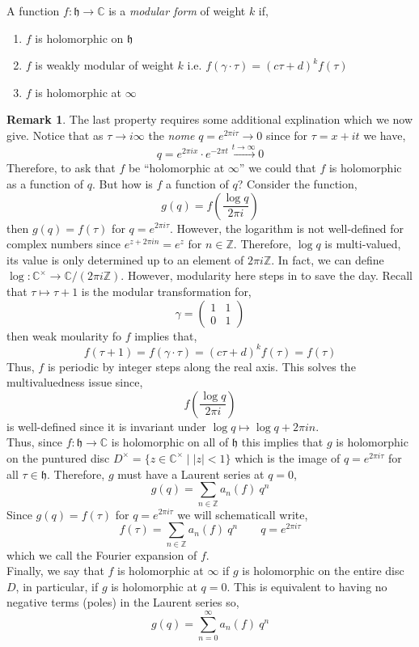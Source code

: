 \documentclass{article}
\newcommand{\Z}{\mathbb{Z}}
\newcommand{\C}{\mathbb{C}}
\theoremstyle{definition}
\newtheorem{remark}{Remark}[section]
\newenvironment{definition}[1][Definition:]{\begin{trivlist}
\item[\hskip \labelsep {\bfseries #1}]}{\end{trivlist}}
\newcommand{\h}{\mathfrak{h}}
\begin{document}
\begin{definition}
A function $f : \h \to \C$ is a \textit{modular form} of weight $k$ if,
\begin{enumerate}
\item $f$ is holomorphic on $\h$
\item $f$ is weakly modular of weight $k$ i.e. $f(\gamma \cdot \tau) = (c \tau + d)^k f(\tau)$
\item $f$ is holomorphic at $\infty$
\end{enumerate}
\end{definition} 

\begin{remark}
The last property requires some additional explination which we now give. Notice that as $\tau \to i \infty$ the \textit{nome} $q = e^{2 \pi i \tau} \to 0$ since for $\tau = x + i t$ we have,
\[ q = e^{2 \pi i x} \cdot e^{- 2 \pi t} \xrightarrow{t \to \infty} 0 \]
Therefore, to ask that $f$ be ``holomorphic at $\infty$'' we could that $f$ is holomorphic as a function of $q$. But how is $f$ a function of $q$? Consider the function,
\[ g(q) = f \left( \frac{\log{q}}{2 \pi i} \right) \]
then $g(q) = f(\tau)$ for $q = e^{2 \pi i \tau}$. However, the logarithm is not well-defined for complex numbers since $e^{z + 2 \pi i n} = e^z$ for $n \in \Z$. Therefore, $\log{q}$ is multi-valued, its value is only determined up to an element of $2 \pi i \Z$. In fact, we can define $\log : \C^\times \to \C / (2 \pi i \Z)$. However, modularity here steps in to save the day. Recall that $\tau \mapsto \tau + 1$ is the modular transformation for,
\[ \gamma = 
\begin{pmatrix}
1 & 1 
\\
0 & 1
\end{pmatrix} \]
then weak moularity fo $f$ implies that,
\[ f(\tau + 1) = f(\gamma \cdot \tau) = (c \tau + d)^k f(\tau) = f(\tau) \]
Thus, $f$ is periodic by integer steps along the real axis. This solves the multivaluedness issue since,
\[ f \left( \frac{\log{q}}{2 \pi i} \right) \]
is well-defined since it is invariant under $\log{q} \mapsto \log{q} + 2 \pi i n$. 
\bigskip\\
Thus, since $f : \h \to \C$ is holomorphic on all of $\h$ this implies that $g$ is holomorphic on the puntured disc $D^\times = \{ z \in \C^\times \mid |z| < 1 \}$ which is the image of $q = e^{2 \pi i \tau}$ for all $\tau \in \h$. Therefore, $g$ must have a Laurent series at $q = 0$,
\[ g(q) = \sum_{n \in \Z} a_n(f) \: q^n \]
Since $g(q) = f(\tau)$ for $q = e^{2 \pi i \tau}$ we will schematicall write,
\[ f(\tau) = \sum_{n \in \Z} a_n(f) \: q^n \quad \quad q = e^{2 \pi i \tau} \]
which we call the Fourier expansion of $f$. 
\bigskip\\
Finally, we say that $f$ is holomorphic at $\infty$ if $g$ is holomorphic on the entire disc $D$, in particular, if $g$ is holomorphic at $q = 0$. This is equivalent to having no negative terms (poles) in the Laurent series so,
\[ g(q) = \sum_{n = 0}^\infty a_n(f) \: q^n \] 
\end{remark}
\end{document}
